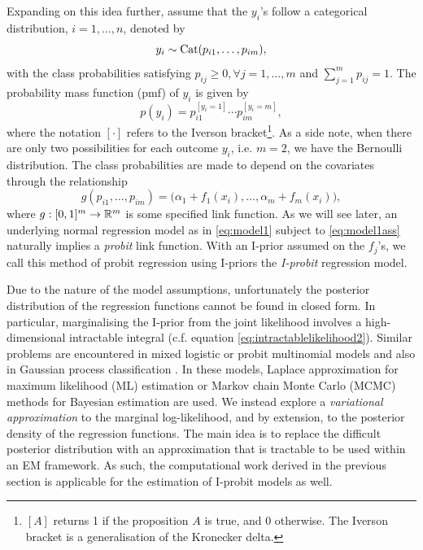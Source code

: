 \documentclass[showframe,11pt,twoside,openright]{report}
\begin{document}
Expanding on this idea further, assume that the $y_i$'s follow a categorical distribution, $i=1,\dots,n$, denoted by
\[
  y_i \sim \operatorname{Cat}(p_{i1},\dots,p_{im}),
\]
with the class probabilities satisfying $p_{ij} \geq 0, \forall j=1,\dots,m$ and $\sum_{j=1}^m p_{ij} = 1$. 
The probability mass function (pmf) of $y_i$ is given by
\begin{equation*}%
  p(y_i) = p_{i1}^{[y_i = 1]} \cdots p_{im}^{[y_i = m]},
\end{equation*}
where the notation $[\cdot]$ refers to the Iverson bracket\footnote{$[A]$ returns 1 if the proposition $A$ is true, and 0 otherwise. The Iverson bracket is a generalisation of the Kronecker delta.}. 
As a side note, when there are only two possibilities for each outcome $y_i$, i.e. $m=2$, we have the Bernoulli distribution.
The class probabilities are made to depend on the covariates through the relationship
\begingroup
\setlength{\abovedisplayskip}{9pt}
\setlength{\belowdisplayskip}{8pt}
\[
  g(p_{i1},\dots,p_{im}) = \big(\alpha_1 + f_1(x_i), \dots, \alpha_m + f_m(x_i)\big),
\]
\endgroup
where $g:[0,1]^m\to\mathbb{R}^m$ is some specified link function.
As we will see later, an underlying normal regression model as in \cref{eq:model1} subject to \cref{eq:model1ass} naturally implies a \emph{probit} link function.
With an I-prior assumed on the $f_j$'s, we call this method of probit regression using I-priors the \emph{I-probit} regression model.


Due to the nature of the model assumptions, unfortunately the posterior distribution of the regression functions cannot be found in closed form.
In particular, marginalising the I-prior from the joint likelihood involves a high-dimensional intractable integral (c.f. equation \ref{eq:intractablelikelihood2}).
Similar problems are encountered in mixed logistic or probit multinomial models \citep{breslow1993approximate,mcculloch2000bayesian} and also in Gaussian process classification \citep{neal1999,rasmussen2006gaussian}.
In these models, Laplace approximation for maximum likelihood (ML) estimation or Markov chain Monte Carlo (MCMC) methods for Bayesian estimation are used. 
We instead explore a \emph{variational approximation} to the marginal log-likelihood, and by extension, to the posterior density of the regression functions.
The main idea is to replace the difficult posterior distribution with an approximation that is tractable to be used within an EM framework.
As such, the computational work derived in the previous section is applicable for the estimation of I-probit models as well.
\end{document}
